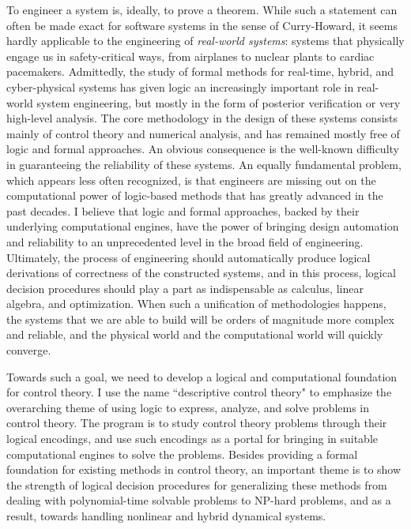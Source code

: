 \documentclass[11pt]{article}
\theoremstyle{definition}
\begin{document}
To engineer a system is, ideally, to prove a theorem. While such a statement can often be made exact for software systems in the sense of Curry-Howard, it seems hardly applicable to the engineering of {\em real-world systems}: systems that physically engage us in safety-critical ways, from airplanes to nuclear plants to cardiac pacemakers. Admittedly, the study of formal methods for real-time, hybrid, and cyber-physical systems has given logic an increasingly important role in real-world system engineering, but mostly in the form of posterior verification or very high-level analysis. The core methodology in the design of these systems consists mainly of control theory and numerical analysis, and has remained mostly free of logic and formal approaches. An obvious consequence is the well-known difficulty in guaranteeing the reliability of these systems. An equally fundamental problem, which appears less often recognized, is that engineers are missing out on the computational power of logic-based methods that has greatly advanced in the past decades. I believe that logic and formal approaches, backed by their underlying computational engines, have the power of bringing design automation and reliability to an unprecedented level in the broad field of engineering. Ultimately, the process of engineering should automatically produce logical derivations of correctness of the constructed systems, and in this process, logical decision procedures should play a part as indispensable as calculus, linear algebra, and optimization. When such a unification of methodologies happens, the systems that we are able to build will be orders of magnitude more complex and reliable, and the physical world and the computational world will quickly converge. 

Towards such a goal, we need to develop a logical and computational foundation for control theory. I use the name ``descriptive control theory" to emphasize the overarching theme of using logic to express, analyze, and solve problems in control theory. The program is to study control theory problems through their logical encodings, and use such encodings as a portal for bringing in suitable computational engines to solve the problems. Besides providing a formal foundation for existing methods in control theory, an important theme is to show the strength of logical decision procedures for generalizing these methods from dealing with polynomial-time solvable problems to NP-hard problems, and as a result, towards handling nonlinear and hybrid dynamical systems. 
 
\end{document}
